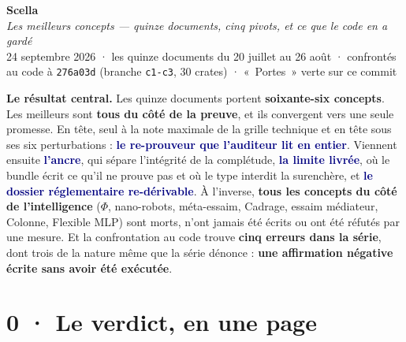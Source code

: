 \documentclass[10pt]{article}
\newcommand{\code}[1]{\texttt{\small #1}}
\newcommand{\mm}[1]{\textbf{\textcolor{navy}{#1}}}
\begin{document}
\begin{center}
{\Huge\bfseries\color{navy} Scella}\\[4pt]
{\large\color{grey}\itshape Les meilleurs concepts --- quinze documents, cinq pivots, et ce que le code en a gardé}\\[4pt]
{\small\color{grey} 24 septembre 2026 \; · \; les quinze documents du 20 juillet au 26 août \; · \; confrontés au code à \code{276a03d} (branche \code{c1-c3}, 30 crates) \; · \; «~Portes~» verte sur ce commit}
\end{center}
\vspace{2pt}

\begin{these}
\textbf{Le résultat central.} Les quinze documents portent \textbf{soixante-six concepts}. Les meilleurs sont
\textbf{tous du côté de la preuve}, et ils convergent vers une seule promesse. En tête, seul à la note maximale de la
grille technique et en tête sous ses six perturbations : \mm{le re-prouveur que l'auditeur lit en entier}. Viennent
ensuite \mm{l'ancre}, qui sépare l'intégrité de la complétude, \mm{la limite livrée}, où le bundle écrit ce
qu'il ne prouve pas et où le type interdit la surenchère, et \mm{le dossier réglementaire re-dérivable}. À
l'inverse, \textbf{tous les concepts du côté de l'intelligence} ($\Phi$, nano-robots, méta-essaim, Cadrage, essaim
médiateur, Colonne, Flexible MLP) sont morts, n'ont jamais été écrits ou ont été réfutés par une mesure. Et la
confrontation au code trouve \textbf{cinq erreurs dans la série}, dont trois de la nature même que la série
dénonce : \textbf{une affirmation négative écrite sans avoir été exécutée}.
\end{these}

\section{0 · Le verdict, en une page}
\end{document}
